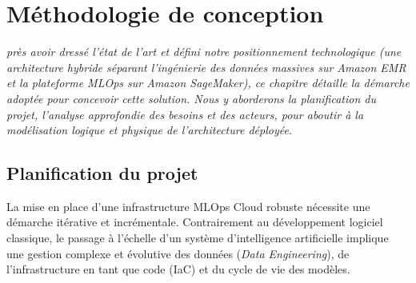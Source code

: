 \let\textcircled=\pgftextcircled

\chapter{Méthodologie de conception} \label{chap:methodologie}

\textit{près avoir dressé l'état de l'art et défini notre positionnement technologique (une architecture hybride séparant l'ingénierie des données massives sur Amazon EMR et la plateforme MLOps sur Amazon SageMaker), ce chapitre détaille la démarche adoptée pour concevoir cette solution. Nous y aborderons la planification du projet, l'analyse approfondie des besoins et des acteurs, pour aboutir à la modélisation logique et physique de l'architecture déployée.}

\renewcommand{\mtctitle}{Sommaire}
\minitoc
\newpage

\section{Planification du projet}

La mise en place d'une infrastructure MLOps Cloud robuste nécessite une démarche itérative et incrémentale. Contrairement au développement logiciel classique, le passage à l'échelle d'un système d'intelligence artificielle implique une gestion complexe et évolutive des données (\textit{Data Engineering}), de l'infrastructure en tant que code (IaC) et du cycle de vie des modèles.

